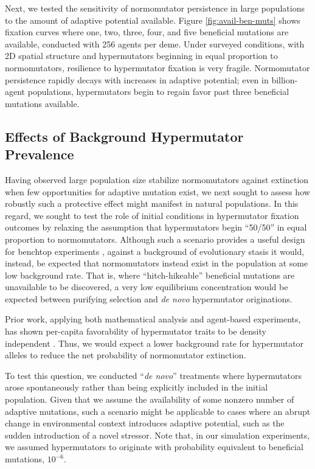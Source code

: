

Next, we tested the sensitivity of normomutator persistence in large populations to the amount of adaptive potential available.
Figure \ref{fig:avail-ben-muts} shows fixation curves where one, two, three, four, and five beneficial mutations are available, conducted with 256 agents per deme.
Under surveyed conditions, with 2D spatial structure and hypermutators beginning in equal proportion to normomutators, resilience to hypermutator fixation is very fragile.
Normomutator persistence rapidly decays with increases in adaptive potential;
even in billion-agent populations, hypermutators begin to regain favor past three beneficial mutations available.

\subsection{Effects of Background Hypermutator Prevalence}
\label{sec:background-hypermutator-prevalence}



Having observed large population size stabilize normomutators against extinction when few opportunities for adaptive mutation exist, we next sought to assess how robustly such a protective effect might manifest in natural populations.
In this regard, we sought to test the role of initial conditions in hypermutator fixation outcomes by relaxing the assumption that hypermutators begin ``50/50'' in equal proportion to normomutators.
Although such a scenario provides a useful design for benchtop experiments \citep{raynes2018sign}, against a background of evolutionary stasis it would, instead, be expected that normomutators instead exist in the population at some low background rate.
That is, where ``hitch-hikeable'' beneficial mutations are unavailable to be discovered, a very low equilibrium concentration would be expected between purifying selection and \textit{de novo} hypermutator originations.

Prior work, applying both mathematical analysis and agent-based experiments, has shown per-capita favorability of hypermutator traits to be density independent \citep{raynes2019selection}.
Thus, we would expect a lower background rate for hypermutator alleles to reduce the net probability of normomutator extinction.

To test this question, we conducted ``\textit{de novo}'' treatments where hypermutators arose spontaneously rather than being explicitly included in the initial population.
Given that we assume the availability of some nonzero number of adaptive mutations, such a scenario might be applicable to cases where an abrupt change in environmental context introduces adaptive potential, such as the sudden introduction of a novel stressor.
Note that, in our simulation experiments, we assumed hypermutators to originate with probability equivalent to beneficial mutations, $10^{-6}$.


